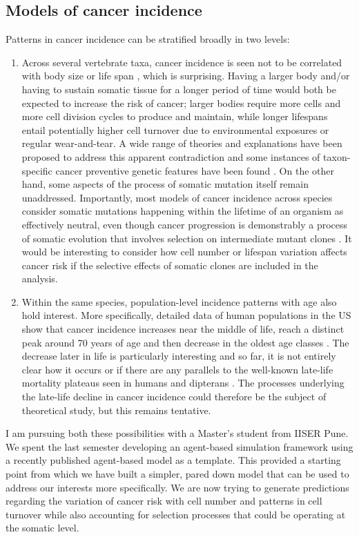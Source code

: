 \documentclass[12pt,onecolumn,twoside]{article}
\begin{document}
	\subsection{Models of cancer incidence}
	Patterns in cancer incidence can be stratified broadly in two levels:
	\begin{enumerate}
		\item Across several vertebrate taxa, cancer incidence is seen not to be correlated with body size or life span \citep{Peto2015}, which is surprising. Having a larger body and/or having to sustain somatic tissue for a longer period of time would both be expected to increase the risk of cancer; larger bodies require more cells and more cell division cycles to produce and maintain, while longer lifespans entail potentially higher cell turnover due to environmental exposures or regular wear-and-tear. A wide range of theories and explanations have been proposed to address this apparent contradiction and some instances of taxon-specific cancer preventive genetic features have been found \citep{Abegglen2015, Tian2013, Gorbunova2014}. On the other hand, some aspects of the process of somatic mutation itself remain unaddressed. Importantly, most models of cancer incidence across species consider somatic mutations happening within the lifetime of an organism as effectively neutral, even though cancer progression is demonstrably a process of somatic evolution that involves selection on intermediate mutant clones \citep{Nowell1976}. It would be interesting to consider how cell number or lifespan variation affects cancer risk if the selective effects of somatic clones are included in the analysis.
		\item Within the same species, population-level incidence patterns with age also hold interest. More specifically, detailed data of human populations in the US show that cancer incidence increases near the middle of life, reach a distinct peak around 70 years of age and then decrease in the oldest age classes \citep{Harding2012}. The decrease later in life is particularly interesting and so far, it is not entirely clear how it occurs or if there are any parallels to the well-known late-life mortality plateaus seen in humans and dipterans \citep{Mueller15249}. The processes underlying the late-life decline in cancer incidence could therefore be the subject of theoretical study, but this remains tentative.
	\end{enumerate}

	I am pursuing both these possibilities with a Master's student from IISER Pune. We spent the last semester developing an agent-based simulation framework using a recently published agent-based model \citep{Erten2020} as a template. This provided a starting point from which we have built a simpler, pared down model that can be used to address our interests more specifically. We are now trying to generate predictions regarding the variation of cancer risk with cell number and patterns in cell turnover while also accounting for selection processes that could be operating at the somatic level.
\end{document}
